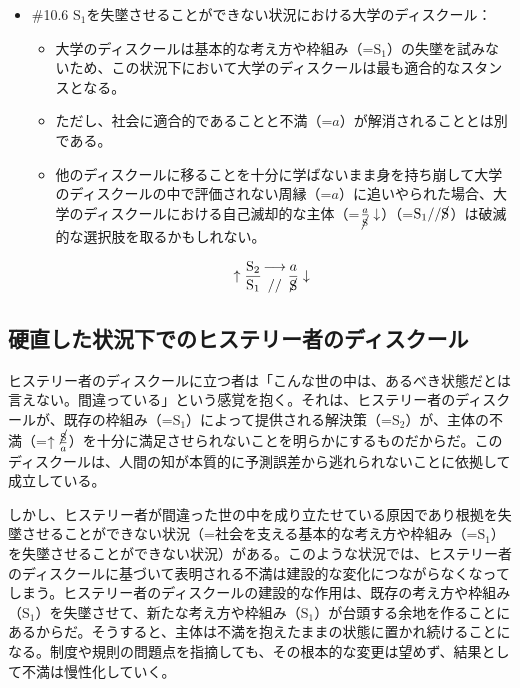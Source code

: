 \begin{note}{}
  \begin{itemize}
    \tightlist
    \item{\#10.6} $\textrm{S}_1$を失墜させることができない状況における大学のディスクール：
      \begin{itemize}
        \tightlist
        \item 大学のディスクールは基本的な考え方や枠組み（=$\textrm{S}_1$）の失墜を試みないため、この状況下において大学のディスクールは最も適合的なスタンスとなる。
        \item ただし、社会に適合的であることと不満（=$a$）が解消されることとは別である。
        \item 他のディスクールに移ることを十分に学ばないまま身を持ち崩して大学のディスクールの中で評価されない周縁（=$a$）に追いやられた場合、大学のディスクールにおける自己滅却的な主体（=$\frac{a}{\cancel{\textrm{S}}}\downarrow$）（=$\textrm{S}_1//\cancel{\textrm{S}}$）は破滅的な選択肢を取るかもしれない。
      \end{itemize}

$$
\uparrow\frac{\mathrm{S_2}}{\mathrm{S_1}}\genfrac{}{}{0pt}{}{\longrightarrow}{//}\frac{a}{\cancel{\textrm{S}}}\downarrow
$$
  \end{itemize}
\end{note}

\subsection{硬直した状況下でのヒステリー者のディスクール}\label{ux786cux76f4ux3057ux305fux72b6ux6cc1ux4e0bux3067ux306eux30d2ux30b9ux30c6ux30eaux30fcux8005ux306eux30c7ux30a3ux30b9ux30afux30fcux30eb}

ヒステリー者のディスクールに立つ者は「こんな世の中は、あるべき状態だとは言えない。間違っている」という感覚を抱く。それは、ヒステリー者のディスクールが、既存の枠組み（=\(\textrm{S}_1\)）によって提供される解決策（=\(\textrm{S}_2\)）が、主体の不満（=\(\uparrow\frac{\cancel{\textrm{S}}}{a}\)）を十分に満足させられないことを明らかにするものだからだ。このディスクールは、人間の知が本質的に予測誤差から逃れられないことに依拠して成立している。

しかし、ヒステリー者が間違った世の中を成り立たせている原因であり根拠を失墜させることができない状況（=社会を支える基本的な考え方や枠組み（=\(\textrm{S}_1\)）を失墜させることができない状況）がある。このような状況では、ヒステリー者のディスクールに基づいて表明される不満は建設的な変化につながらなくなってしまう。ヒステリー者のディスクールの建設的な作用は、既存の考え方や枠組み（\(\textrm{S}_1\)）を失墜させて、新たな考え方や枠組み（\(\textrm{S}_1\)）が台頭する余地を作ることにあるからだ。そうすると、主体は不満を抱えたままの状態に置かれ続けることになる。制度や規則の問題点を指摘しても、その根本的な変更は望めず、結果として不満は慢性化していく。

